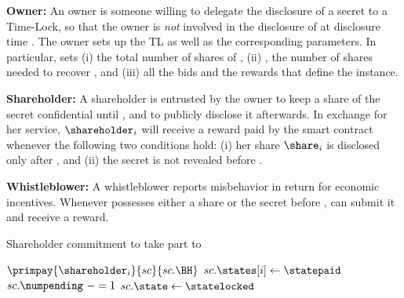 \begin{asparaitem}
\item {\bf Owner:}	An owner \owner is someone willing to delegate the disclosure of a secret \secret to a Time-Lock, so that the owner is \textit{not} involved in the disclosure of \secret at disclosure time \td.
The owner \owner sets up the TL as well as the corresponding parameters.
In particular, \owner sets (i) \N the total number of shares \share of \secret, (ii) \K, the number of shares needed to recover \secret, and (iii) all the bids and the rewards that define the instance.


\item {\bf Shareholder:}
A shareholder \shareholder is entrusted by the owner \owner to keep a share \share of the secret \secret confidential until \td, and to publicly disclose it afterwards.
In exchange for her service, $\shareholder_{i}$ will receive a reward paid by the smart contract whenever the following two conditions hold: (i) her share $\share_{i}$ is disclosed only after \td, and (ii) the secret \secret is not revealed before \td.

\item {\bf Whistleblower:}
A whistleblower \whistleblower reports misbehavior in return for economic incentives.
Whenever \whistleblower possesses either a share \share or the secret \secret before \td, \whistleblower can submit it and receive a reward.
\end{asparaitem}


\begin{algorithm}[t]
	\caption{Shareholder commitment to take part to \shortname}\label{algo:shareholder_commitment}
	\begin{algorithmic}[1]
		\vspace{0.6em}
		\vspace*{0.6em}
		
		\State $\primpay{\shareholder_i}{sc}{sc.\BH}$
		\State $sc.\states[i]\gets \statepaid$
		\State $sc.\numpending\ -= 1$
		\State $sc.\state\gets \statelocked$
		\EndIf
		\EndIf
		\EndProcedure
	\end{algorithmic}
\end{algorithm}

